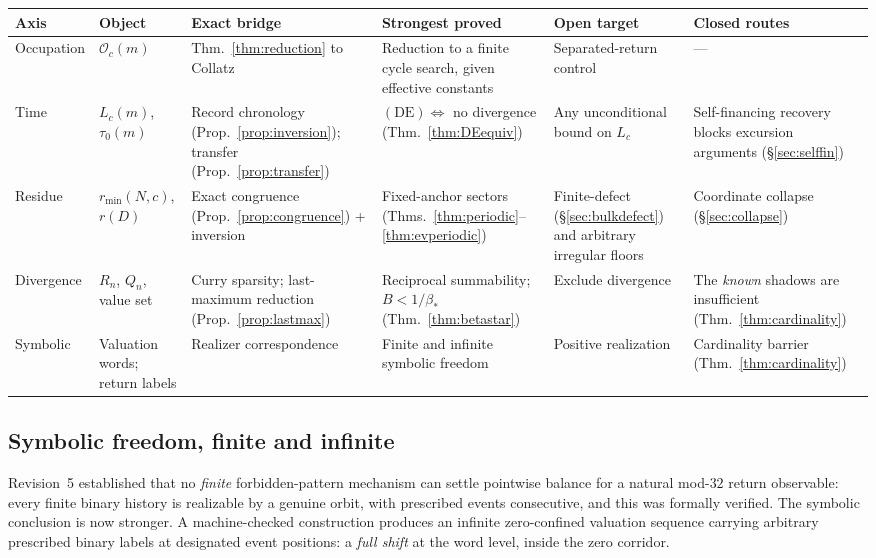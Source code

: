 \documentclass[11pt]{article}
\theoremstyle{plain}
\theoremstyle{definition}
\theoremstyle{remark}
\newcommand{\Occ}{\mathcal{O}}
\newcommand{\rmin}{r_{\min}}
\begin{document}
\begin{center}
\scriptsize
\begin{tabular}{@{}p{}p{}p{}p{}p{}p{}@{}}
\toprule
Axis & Object & Exact bridge & Strongest proved & Open target & Closed routes \\
\midrule
Occupation & $\Occ_c(m)$ & Thm.~\ref{thm:reduction} to Collatz & Reduction to a finite cycle
search, given effective constants & Separated-return control & --- \\
Time & $L_c(m)$, $\tau_0(m)$ & Record chronology (Prop.~\ref{prop:inversion}); transfer
(Prop.~\ref{prop:transfer}) & $(\mathrm{DE})\iff$ no divergence (Thm.~\ref{thm:DEequiv}) &
Any unconditional bound on $L_c$ & Self-financing recovery blocks excursion arguments
(\S\ref{sec:selffin}) \\
Residue & $\rmin(N,c)$, $r(D)$ & Exact congruence (Prop.~\ref{prop:congruence}) + inversion &
Fixed-anchor sectors (Thms.~\ref{thm:periodic}--\ref{thm:evperiodic}) & Finite-defect
(\S\ref{sec:bulkdefect}) and arbitrary irregular floors & Coordinate collapse
(\S\ref{sec:collapse}) \\
Divergence & $R_n$, $Q_n$, value set & Curry sparsity; last-maximum reduction
(Prop.~\ref{prop:lastmax}) & Reciprocal summability; $B<1/\beta_*$ (Thm.~\ref{thm:betastar}) &
Exclude divergence & The \emph{known} shadows are insufficient (Thm.~\ref{thm:cardinality}) \\
Symbolic & Valuation words; return labels & Realizer correspondence & Finite and infinite symbolic
freedom & Positive realization & Cardinality barrier (Thm.~\ref{thm:cardinality}) \\
\bottomrule
\end{tabular}
\end{center}

\subsection{Symbolic freedom, finite and infinite}\label{sec:symbolic}

Revision~5 established that no \emph{finite} forbidden-pattern mechanism can settle pointwise
balance for a natural mod-$32$ return observable: every finite binary history is realizable by a
genuine orbit, with prescribed events consecutive, and this was formally verified. The symbolic
conclusion is now stronger. A machine-checked construction produces an infinite zero-confined
valuation sequence carrying arbitrary prescribed binary labels at designated event positions: a
\emph{full shift} at the word level, inside the zero corridor.
\end{document}
